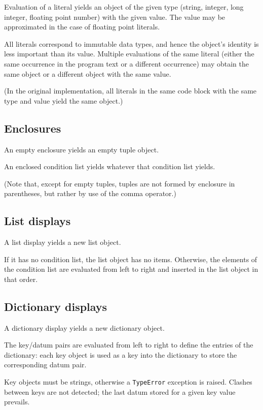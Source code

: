 Evaluation of a literal yields an object of the given type
(string, integer, long integer, floating point number)
with the given value.
The value may be approximated in the case of floating point literals.

All literals correspond to immutable data types, and hence the object's
identity is less important than its value.
Multiple evaluations of the same literal (either the same occurrence
in the program text or a different occurrence) may
obtain the same object or a different object with the same value.

(In the original implementation, all literals in the same code block
with the same type and value yield the same object.)

\subsection{Enclosures}

An empty enclosure yields an empty tuple object.

An enclosed condition list yields whatever that condition list yields.

(Note that, except for empty tuples, tuples are not formed by
enclosure in parentheses, but rather by use of the comma operator.)

\subsection{List displays}

A list display yields a new list object.

If it has no condition list, the list object has no items.
Otherwise, the elements of the condition list are evaluated
from left to right and inserted in the list object in that order.

\subsection{Dictionary displays}

A dictionary display yields a new dictionary object.

The key/datum pairs are evaluated from left to right to
define the entries of the dictionary:
each key object is used as a key into the dictionary to store
the corresponding datum pair.

Key objects must be strings, otherwise a {\tt TypeError}
exception is raised.
Clashes between keys are not detected; the last datum stored for a given
key value prevails.

